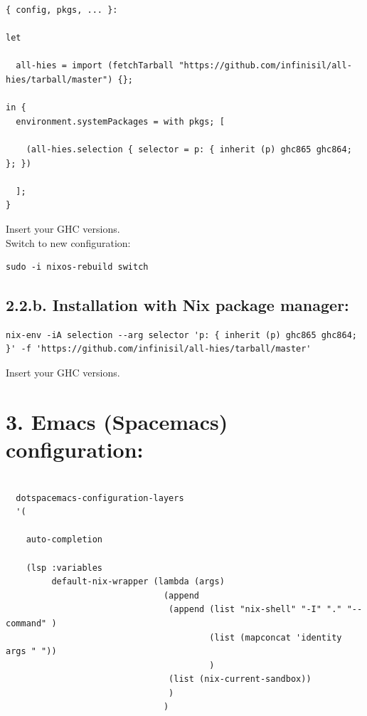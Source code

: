 \documentclass[a4paper,14pt,oneside]{book}
\begin{document}
{\begin{verbatim}
{ config, pkgs, ... }:

let

  all-hies = import (fetchTarball "https://github.com/infinisil/all-hies/tarball/master") {};

in {
  environment.systemPackages = with pkgs; [

    (all-hies.selection { selector = p: { inherit (p) ghc865 ghc864; }; })

  ];
}
\end{verbatim}

Insert your GHC versions.\\

Switch to new configuration:\\

\begin{verbatim}
sudo -i nixos-rebuild switch
\end{verbatim}

\subsection{2.2.b. Installation with Nix package manager:}
\label{sec:org250a456}

\begin{verbatim}
nix-env -iA selection --arg selector 'p: { inherit (p) ghc865 ghc864; }' -f 'https://github.com/infinisil/all-hies/tarball/master'
\end{verbatim}

Insert your GHC versions.\\

\section{3. Emacs (Spacemacs) configuration:}
\label{sec:org005f1c3}

\begin{verbatim}

  dotspacemacs-configuration-layers
  '(

    auto-completion

    (lsp :variables
         default-nix-wrapper (lambda (args)
                               (append
                                (append (list "nix-shell" "-I" "." "--command" )
                                        (list (mapconcat 'identity args " "))
                                        )
                                (list (nix-current-sandbox))
                                )
                               )


\end{verbatim}}
\end{document}
